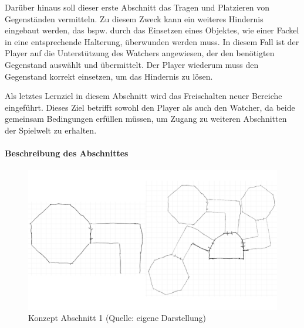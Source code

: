 Darüber hinaus soll dieser erste Abschnitt das Tragen und Platzieren von Gegenständen vermitteln. Zu diesem Zweck kann ein weiteres Hindernis eingebaut werden, das bspw. durch das Einsetzen eines Objektes, wie einer Fackel in eine entsprechende Halterung, überwunden werden muss. In diesem Fall ist der Player auf die Unterstützung des Watchers angewiesen, der den benötigten Gegenstand auswählt und übermittelt. Der Player wiederum muss den Gegenstand korrekt einsetzen, um das Hindernis zu lösen.

Als letztes Lernziel in diesem Abschnitt wird das Freischalten neuer Bereiche eingeführt. Dieses Ziel betrifft sowohl den Player als auch den Watcher, da beide gemeinsam Bedingungen erfüllen müssen, um Zugang zu weiteren Abschnitten der Spielwelt zu erhalten.

\paragraph{Beschreibung des Abschnittes}

\begin{figure}[ht]
\centering
\includegraphics[width=1\linewidth]{content/pictures/Abschnitt_Concept_00.png}
\caption{Konzept Abschnitt 1 (Quelle: eigene Darstellung)}
\label{fig:section_00_concept}
\end{figure}


